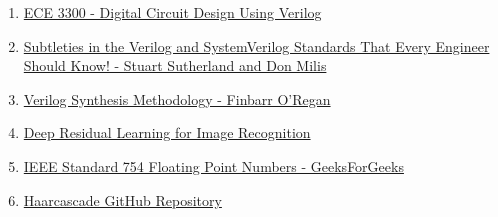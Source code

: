 \documentclass{article}
\begin{document}
    \begin{enumerate}
        \item \href{https://www.youtube.com/watch?v=Kt-78I-NUgY&list=PL-iIOnHwN7NXw01eBDR7wI8KzGK4mu8Sr&pp=iAQB}{ECE 3300 - Digital Circuit Design Using Verilog}

        \item \href{https://www.sutherland-hdl.com/papers/2006-SNUG-Boston_standard_gotchas_presentation.pdf}{Subtleties in the Verilog and SystemVerilog Standards That Every Engineer Should Know! - Stuart Sutherland and Don Milis}

        \item \href{https://people.ece.cornell.edu/land/courses/ece5760/Verilog/coding_and_synthesis_with_verilog.pdf}{Verilog Synthesis Methodology - Finbarr O’Regan}

        \item \href{https://arxiv.org/pdf/1512.03385.pdf}{Deep Residual Learning for Image Recognition}

        \item \href{https://www.geeksforgeeks.org/ieee-standard-754-floating-point-numbers/}{IEEE Standard 754 Floating Point Numbers - GeeksForGeeks}

        \item \href{https://github.com/opencv/opencv/tree/master/data/haarcascades}{Haarcascade GitHub Repository}
    \end{enumerate}


        
\end{document}
